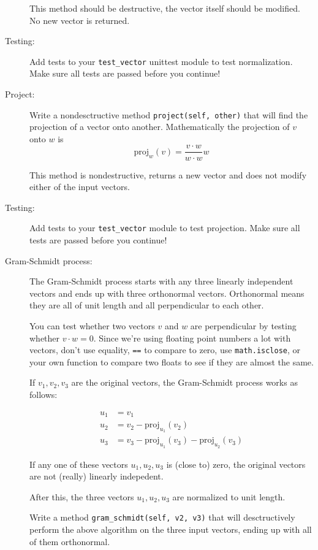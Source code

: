 \documentclass[12pt]{article}
\begin{document}
\begin{description}
This method should be destructive, the vector
itself should be modified.  No new vector is returned.


\item[Testing:] 
Add tests to your \lstinline{test_vector} unittest
module to test normalization.  Make sure all
tests are passed before
you continue!

\item[Project:] Write a nondesctructive method
\lstinline{project(self, other)}
that will find the projection of a vector onto another.
Mathematically the projection of $v$  onto $w$
is
\[ \mbox{proj}_w(v) = \frac{v \cdot w}{w \cdot w} w \]

This method is nondestructive, returns a new
vector and does not modify either of the input
vectors.


\item[Testing:] 
Add tests to your \lstinline{test_vector}
module to test projection.   Make sure all
tests are passed before
you continue!

\item[Gram-Schmidt process:]  The Gram-Schmidt
process starts with any three linearly independent
vectors and ends up with three orthonormal vectors.
Orthonormal means they are all of unit length
and all perpendicular to each other.

You can test whether two vectors $v$ and $w$ are perpendicular
by testing whether $v\cdot w = 0$.  Since we're using
floating point numbers a lot with vectors, don't use equality,
\lstinline{==} to compare to zero, use \lstinline{math.isclose},
or your own function to compare two floats to see
if they are almost the same.

If $v_1, v_2, v_3$ are the original vectors, the Gram-Schmidt
process works as follows:

\begin{align*}
u_1 &= v_1\\
u_2 &= v_2 - \mbox{proj}_{u_1}(v_2)\\
u_3 &= v_3 - \mbox{proj}_{u_1}(v_3)- \mbox{proj}_{u_2}(v_3)
\end{align*}

If any one of these vectors $u_1, u_2, u_3$ is (close to) zero,
the original vectors are not (really) linearly indepedent.

After this, the three vectors $u_1, u_2, u_3$ are
normalized to unit length.

Write a method \lstinline{gram_schmidt(self, v2, v3)}
that will desctructively perform the above algorithm
on the three input vectors, ending up with all of them
orthonormal. 


\end{description}
\end{document}
